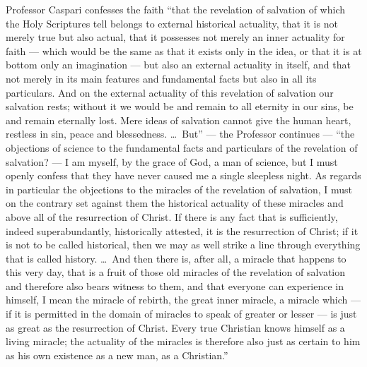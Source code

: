 \documentclass[12pt]{book}
\newcommand{\opage}[1]{\marginnote{\footnotesize\textit{[#1]}}}
\begin{document}
Professor Caspari confesses the faith ``that the revelation of salvation
of which the Holy Scriptures tell belongs to external historical
actuality, that it is not merely true but also actual, that it possesses
not merely an inner actuality for faith --- which would be the same as
that it exists only in the idea, or that it is at bottom only an
imagination --- but also an external actuality in itself, and that not
merely in its main features and fundamental facts but also in all its
particulars. And on the external actuality of this revelation of
salvation our salvation rests; without it we would be and remain to all
eternity in our sins, be and remain eternally lost. Mere ideas of
salvation cannot give the human heart, restless in sin, peace and
blessedness. \ldots\ But'' --- the Professor continues --- ``the objections
of science to the fundamental facts and particulars of the revelation of
salvation? --- I am myself, by the grace of God, a man of science, but I
must openly confess that they have never caused me a single sleepless
night. As regards in particular the objections to the miracles of the
revelation of salvation, I must on the contrary set against them the
historical actuality of these miracles and above all of the resurrection
of Christ. If there is any fact that is sufficiently, indeed
superabundantly, historically attested, it is the resurrection of Christ;
if it is not to be called historical, then we may as well strike a line
through everything that is called history. \ldots\ And then there is,
after all, a miracle that happens to this very day, that is a fruit of
those old miracles of the revelation of salvation and therefore also
bears witness to them, and that everyone can experience in himself, I
mean the miracle of rebirth, the great inner miracle, a miracle which ---
if it is permitted in the domain of
\opage{299}\setcounter{footnote}{0}%
miracles to speak of greater or lesser --- is just as great as the
resurrection of Christ. Every true Christian knows himself as a living
miracle; the actuality of the miracles is therefore also just as certain
to him as his own existence as a new man, as a Christian.''
\end{document}
